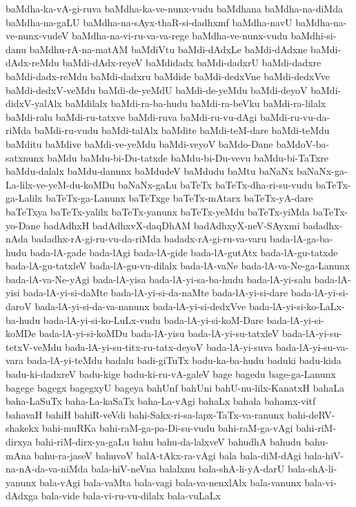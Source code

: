{baMdha-ka-vA-gi-ruva
baMdha-ka-ve-nunx-vudu
baMdhana
baMdha-na-diMda
baMdha-na-gaLU
baMdha-na-sAyx-thaR-si-dadhxmf
baMdha-navU
baMdha-na-ve-nunx-vudeV
baMdha-na-vi-ru-va-va-rege
baMdha-ve-nunx-vudu
baMdhi-si-danu
baMdhu-rA-na-matAM
baMdiVtu
baMdi-dAdxLe
baMdi-dAdxne
baMdi-dAdx-reMdu
baMdi-dAdx-reyeV
baMdidadx
baMdi-dadxrU
baMdi-dadxre
baMdi-dadx-reMdu
baMdi-dadxru
baMdide
baMdi-dedxVne
baMdi-dedxVve
baMdi-dedxV-veMdu
baMdi-de-yeMdU
baMdi-de-yeMdu
baMdi-deyoV
baMdi-didxV-yalAlx
baMdilalx
baMdi-ra-ba-hudu
baMdi-ra-beVku
baMdi-ra-lilalx
baMdi-ralu
baMdi-ru-tatxve
baMdi-ruva
baMdi-ru-vu-dAgi
baMdi-ru-vu-da-riMda
baMdi-ru-vudu
baMdi-talAlx
baMdite
baMdi-teM-dare
baMdi-teMdu
baMditu
baMdive
baMdi-ve-yeMdu
baMdi-veyoV
baMdo-Dane
baMdoV-ba-satxnunx
baMdu
baMdu-bi-Du-tatxde
baMdu-bi-Du-vevu
baMdu-bi-TaTxre
baMdu-dalalx
baMdu-danunx
baMdudeV
baMdudu
baMtu
baNaNx
baNaNx-ga-La-lilx-ve-yeM-du-koMDu
baNaNx-gaLu
baTeTx
baTeTx-dha-ri-su-vudu
baTeTx-ga-Lalilx
baTeTx-ga-Lanunx
baTeTxge
baTeTx-mAtarx
baTeTx-yA-dare
baTeTxya
baTeTx-yalilx
baTeTx-yanunx
baTeTx-yeMdu
baTeTx-yiMda
baTeTx-yo-Dane
badAdhxH
badAdhxvX-daqDhAM
badAdhxyX-neV-SAyxmi
badadhx-nAda
badadhx-rA-gi-ru-vu-da-riMda
badadx-rA-gi-ru-va-varu
bada-lA-ga-ba-hudu
bada-lA-gade
bada-lAgi
bada-lA-gide
bada-lA-gutAtx
bada-lA-gu-tatxde
bada-lA-gu-tatxleV
bada-lA-gu-vu-dilalx
bada-lA-vaNe
bada-lA-va-Ne-ga-Lanunx
bada-lA-va-Ne-yAgi
bada-lA-yisa
bada-lA-yi-sa-ba-hudu
bada-lA-yi-salu
bada-lA-yisi
bada-lA-yi-si-daMte
bada-lA-yi-si-da-naMte
bada-lA-yi-si-dare
bada-lA-yi-si-daroV
bada-lA-yi-si-da-va-nanunx
bada-lA-yi-si-dedxVve
bada-lA-yi-si-ko-LaLx-ba-hudu
bada-lA-yi-si-ko-LuLx-vudu
bada-lA-yi-si-koM-Dare
bada-lA-yi-si-koMDe
bada-lA-yi-si-koMDu
bada-lA-yisu
bada-lA-yi-su-tatxleV
bada-lA-yi-su-tetxV-veMdu
bada-lA-yi-su-titx-ru-tatx-deyoV
bada-lA-yi-suva
bada-lA-yi-su-va-vara
bada-lA-yi-teMdu
badalu
badi-giTuTx
badu-ka-ba-hudu
baduki
badu-kida
badu-ki-dadxreV
badu-kige
badu-ki-ru-vA-galeV
bage
bagedu
bage-ga-Lanunx
bagege
bagegx
bagegxyU
bageya
bahUnf
bahUni
bahU-nu-lilx-KanatxH
bahaLa
baha-LaSuTx
baha-La-kaSaTx
baha-La-vAgi
bahaLx
bahala
bahamx-vitf
bahavaH
bahiH
bahiR-veVdi
bahi-Sakx-ri-sa-lapx-TaTx-va-ranunx
bahi-deRV-shakekx
bahi-muRKa
bahi-raM-ga-pa-Di-su-vudu
bahi-raM-ga-vAgi
bahi-riM-dirxya
bahi-riM-dirx-ya-gaLu
bahu
bahu-da-lalxveV
bahudhA
bahudu
bahu-mAna
bahu-ra-jaseV
bahuvoV
balA-tAkx-ra-vAgi
bala
bala-diM-dAgi
bala-hiV-na-nA-da-va-niMda
bala-hiV-neVna
balalxnu
bala-shA-li-yA-darU
bala-shA-li-yanunx
bala-vAgi
bala-vaMta
bala-vagi
bala-va-nenxlAlx
bala-vanunx
bala-vi-dAdxga
bala-vide
bala-vi-ru-vu-dilalx
bala-vuLaLx
}

